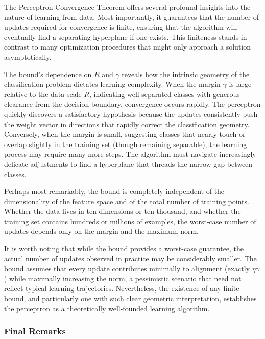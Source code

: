 The Perceptron Convergence Theorem offers several profound insights into the nature of learning from data. Most importantly, it guarantees that the number of updates required for convergence is finite, ensuring that the algorithm will eventually find a separating hyperplane if one exists. This finiteness stands in contrast to many optimization procedures that might only approach a solution asymptotically.

The bound's dependence on $R$ and $\gamma$ reveals how the intrinsic geometry of the classification problem dictates learning complexity. When the margin $\gamma$ is large relative to the data scale $R$, indicating well-separated classes with generous clearance from the decision boundary, convergence occurs rapidly. The perceptron quickly discovers a satisfactory hypothesis because the updates consistently push the weight vector in directions that rapidly correct the classification geometry. Conversely, when the margin is small, suggesting classes that nearly touch or overlap slightly in the training set (though remaining separable), the learning process may require many more steps. The algorithm must navigate increasingly delicate adjustments to find a hyperplane that threads the narrow gap between classes.

Perhaps most remarkably, the bound is completely independent of the dimensionality of the feature space and of the total number of training points. Whether the data lives in ten dimensions or ten thousand, and whether the training set contains hundreds or millions of examples, the worst-case number of updates depends only on the margin and the maximum norm. %

It is worth noting that while the bound provides a worst-case guarantee, the actual number of updates observed in practice may be considerably smaller. The bound assumes that every update contributes minimally to alignment (exactly $\eta\gamma$) while maximally increasing the norm, a pessimistic scenario that need not reflect typical learning trajectories. Nevertheless, the existence of any finite bound, and particularly one with such clear geometric interpretation, establishes the perceptron as a theoretically well-founded learning algorithm.

\medskip
\subsubsection*{Final Remarks}

